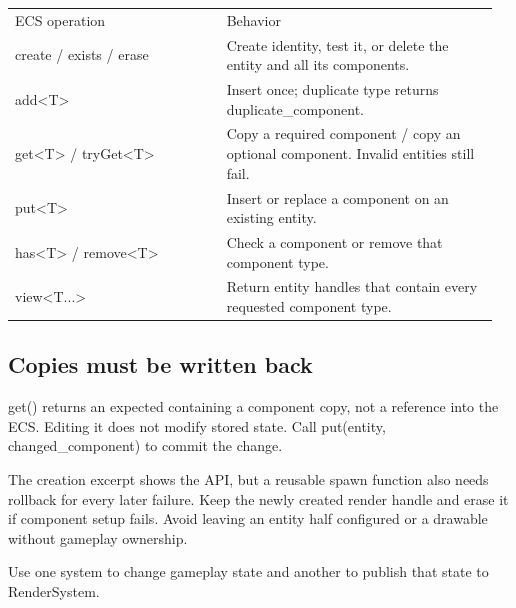 \documentclass[11pt,a4paper]{article}
\begin{document}
{\small
\begin{longtable}{@{}p{0.42\linewidth}p{0.54\linewidth}@{}}
ECS operation & Behavior \\
create / exists / erase & Create identity, test it, or delete the entity and all its components. \\
add<T> & Insert once; duplicate type returns duplicate\_component. \\
get<T> / tryGet<T> & Copy a required component / copy an optional component. Invalid entities still fail. \\
put<T> & Insert or replace a component on an existing entity. \\
has<T> / remove<T> & Check a component or remove that component type. \\
view<T...> & Return entity handles that contain every requested component type. \\
\end{longtable}
}

\subsection*{Copies must be written back}
get() returns an expected containing a component copy, not a reference into the ECS. Editing it does not modify stored state. Call put(entity, changed\_component) to commit the change.

The creation excerpt shows the API, but a reusable spawn function also needs rollback for every later failure. Keep the newly created render handle and erase it if component setup fails. Avoid leaving an entity half configured or a drawable without gameplay ownership.

\label{core-65}
Use one system to change gameplay state and another to publish that state to RenderSystem.
\end{document}
